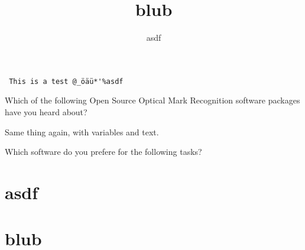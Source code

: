 \documentclass[
  english,
  pagemark,
  stamp]{sdapsclassic}
\author{asdf}
\title{blub}
\begin{document}
  \begin{questionnaire}

\begin{verbatim}
 This is a test @_öäü*'%asdf

\end{verbatim}



    \begin{choicequestion}[cols=3]{Which of the following Open Source
                                   Optical Mark Recognition software
                                   packages have you heard about?}

    \end{choicequestion}

    \begin{choicequestion}[cols=3,var=q,text=tq]{Same thing again, with variables and text.}

    \end{choicequestion}

    \begin{choicegroup}{Which software do you prefere for the following tasks?}
      \groupaddchoice{\LaTeX}

    \end{choicegroup}


\section{asdf}


\section{blub}

  \end{questionnaire}
\end{document}
